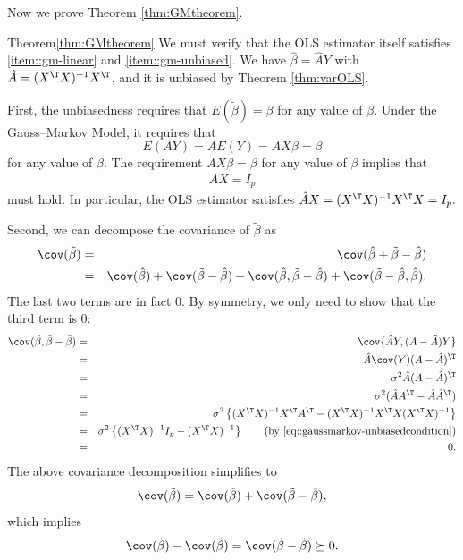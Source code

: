 Now we prove Theorem \ref{thm:GMtheorem}. 

\begin{myproof}{Theorem}{\ref{thm:GMtheorem}}
We must verify that the OLS estimator itself satisfies \eqref{item::gm-linear} and \eqref{item::gm-unbiased}. We have $\hat{\beta}=\hat{A}Y$ with  $\hat{A}=(X^{\T}X)^{-1}X^{\T}$, and it is unbiased by Theorem \ref{thm:varOLS}. 

First, the unbiasedness requires that $E(\tilde{\beta}) =\beta$ for any value of $\beta$. Under the Gauss--Markov Model, it requires that 
$$
E(AY)=AE(Y)=AX\beta=\beta
$$
for any value of $\beta$. The requirement $AX\beta=\beta$ for any value of $\beta$ implies that 
\begin{eqnarray}\label{eq::gaussmarkov-unbiasedcondition}
 AX=I_{p}
\end{eqnarray}
 must hold. In particular,
the OLS estimator satisfies $\hat{A}X = (X^{\T}X)^{-1}X^{\T} X =I_{p}.$

Second, we can decompose the covariance of $\tilde{\beta}$ as
\begin{eqnarray*}
\cov(\tilde{\beta}) 
&=& \cov(\hat{\beta} + \tilde{\beta} - \hat{\beta} ) \\
&=&  \cov(\hat{\beta} )  + \cov ( \tilde{\beta} - \hat{\beta} ) 
+ \cov(\hat{\beta} ,  \tilde{\beta} - \hat{\beta})   +  \cov(   \tilde{\beta} - \hat{\beta}, \hat{\beta}) .
\end{eqnarray*}
The last two terms are in fact 0. By symmetry, we only need to
show that the third term is 0:
\begin{eqnarray*}
  \cov(\hat{\beta} ,  \tilde{\beta} - \hat{\beta})   
& = &\cov\{ \hat{A}Y,(A-\hat{A})Y \} \\
 & =&\hat{A}\cov(Y)(A-\hat{A})^{\T}\\
 & =&\sigma^{2}\hat{A}(A-\hat{A})^{\T}\\
 & =&\sigma^{2}(\hat{A}A^{\T}-\hat{A}\hat{A}^{\T})\\
 & =&\sigma^{2}\left\{ (X^{\T}X)^{-1}X^{\T}A^{\T}-(X^{\T}X)^{-1}X^{\T}X(X^{\T}X)^{-1}\right\} \\
 & =&\sigma^{2}\left\{ (X^{\T}X)^{-1}I_{p}-(X^{\T}X)^{-1}\right\}  \qquad (\text{by } \eqref{eq::gaussmarkov-unbiasedcondition}) \\
 & =&0.
\end{eqnarray*}
The above covariance decomposition simplifies to
\[
\cov(\tilde{\beta})= \cov(\hat{\beta} )  + \cov ( \tilde{\beta} - \hat{\beta} )  , 
\]
which implies 
\[
\cov(\tilde{\beta})-\cov(\hat{\beta}) = \cov(\tilde{\beta} - \hat{\beta}) \succeq 0. 
\]
\end{myproof}




